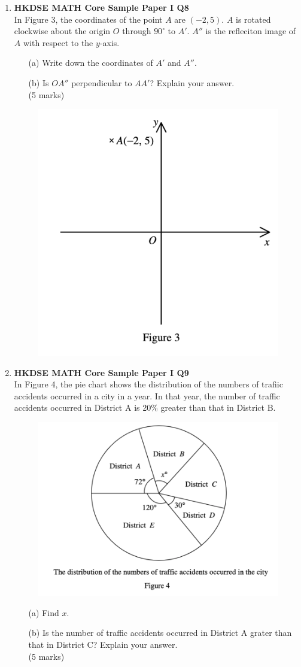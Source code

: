 \documentclass[12pt]{article}
\begin{document}
\begin{enumerate}
	\item \textbf{HKDSE MATH Core Sample Paper I Q8}\\
	In Figure 3, the coordinates of the point $A$ are $(-2, 5)$. $A$ is rotated clockwise about the origin $O$ through $90^\circ$ to $A'$. $A''$ is the refleciton image of $A$ with respect to the $y$-axis.
	\begin{enumerate}
		\item[(a)] Write down the coordinates of $A'$ and $A''$.
		\item[(b)] Is $OA''$ perpendicular to $AA'$? Explain your answer. \\(5 marks)
	\end{enumerate}
	\begin{figure}[H]
		\centering
		\includegraphics[width = .5\linewidth]{SPFigure1.3}
	\end{figure}

	\item \textbf{HKDSE MATH Core Sample Paper I Q9}\\
	In Figure 4, the pie chart shows the distribution of the numbers of trafiic accidents occurred in a city in a year. In that year, the number of traffic accidents occurred in District A is 20\% greater than that in District B.
	\begin{figure}[H]
		\centering
		\includegraphics[width = .5\linewidth]{SPFigure1.4}
	\end{figure}
	\begin{enumerate}
		\item[(a)] Find $x$.
		\item[(b)] Is the number of traffic accidents occurred in District A grater than that in District C? Explain your answer. \\(5 marks)
	\end{enumerate}



\end{enumerate}
\end{document}
